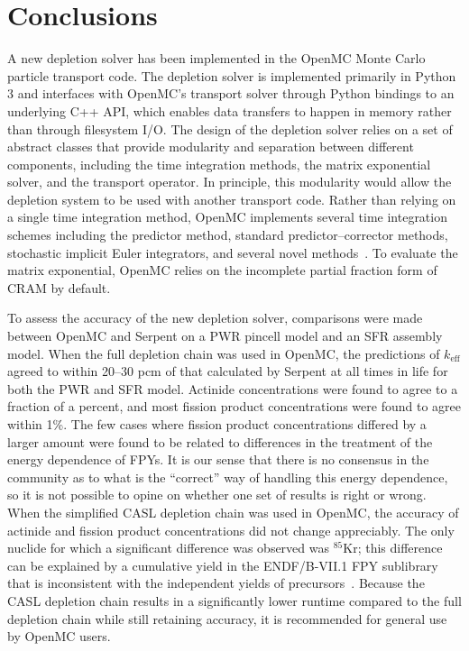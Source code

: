 \documentclass[3p,authoryear]{elsarticle}
\begin{document}
\section{Conclusions}
\label{sec:conclusions}

A new depletion solver has been implemented in the OpenMC Monte Carlo particle
transport code. The depletion solver is implemented primarily in Python 3 and
interfaces with OpenMC's transport solver through Python bindings to an
underlying C++ API, which enables data transfers to happen in memory rather than
through filesystem I/O. The design of the depletion solver relies on a set of
abstract classes that provide modularity and separation between different
components, including the time integration methods, the matrix exponential
solver, and the transport operator. In principle, this modularity would allow
the depletion system to be used with another transport code. Rather than relying
on a single time integration method, OpenMC implements several time integration
schemes including the predictor method, standard predictor--corrector methods,
stochastic implicit Euler integrators, and several novel
methods~\citep{josey2017phd, josey2017jcp}. To evaluate the matrix exponential,
OpenMC relies on the incomplete partial fraction form of CRAM by default.

To assess the accuracy of the new depletion solver, comparisons were made
between OpenMC and Serpent on a PWR pincell model and an SFR assembly model.
When the full depletion chain was used in OpenMC, the predictions of
$k_\text{eff}$ agreed to within 20--30 pcm of that calculated by Serpent at all
times in life for both the PWR and SFR model. Actinide concentrations were found
to agree to a fraction of a percent, and most fission product concentrations
were found to agree within 1\%. The few cases where fission product
concentrations differed by a larger amount were found to be related to
differences in the treatment of the energy dependence of FPYs. It is our sense
that there is no consensus in the community as to what is the ``correct'' way of
handling this energy dependence, so it is not possible to opine on whether one
set of results is right or wrong. When the simplified CASL depletion chain was
used in OpenMC, the accuracy of actinide and fission product concentrations did
not change appreciably. The only nuclide for which a significant difference was
observed was $^{85}$Kr; this difference can be explained by a cumulative yield
in the ENDF/B-VII.1 FPY sublibrary that is inconsistent with the independent
yields of precursors~\citep{pigni2015nds}. Because the CASL depletion chain
results in a significantly lower runtime compared to the full depletion chain
while still retaining accuracy, it is recommended for general use by OpenMC
users.
\end{document}
